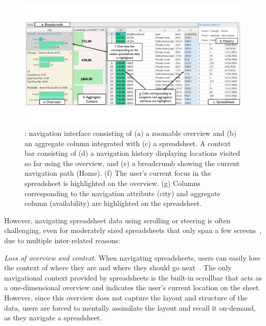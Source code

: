 \begin{figure}
     \centering %
  \includegraphics[width=\linewidth,trim={0 95 0 80},clip]{images/screenshot.pdf}
    \caption{\noah: navigation interface consisting of (a) a zoomable overview and (b) an aggregate column integrated with (c) a spreadsheet. A context bar consisting of (d) a navigation history displaying locations visited so far using the overview, and (e) a breadcrumb showing the current navigation path (\eg Home). (f) The user’s current focus in the spreadsheet is highlighted on the overview. (g) Columns corresponding to the navigation attribute (city) and aggregate column (availability) are highlighted on the spreadsheet.}
  \label{fig:ux}
\end{figure}

However, navigating spreadsheet data using scrolling or steering
is often challenging, even for moderately sized spreadsheets that only span
a few screens~\cite{network-context,nardi1990spreadsheet}, due to multiple inter-related reasons:
\squishlist
\item {\em Loss of overview and context.}
When navigating
spreadsheets, users can easily lose the context
of where they are and where they should go next~\cite{network-context}.
The only navigational context provided by spreadsheets
is the built-in scrollbar that acts as a one-dimensional
overview and indicates the user's current location on the sheet.
However, since this overview does not capture the
layout and structure of the data,
users are forced to mentally assimilate
the layout and recall it on-demand, as they navigate a spreadsheet.

